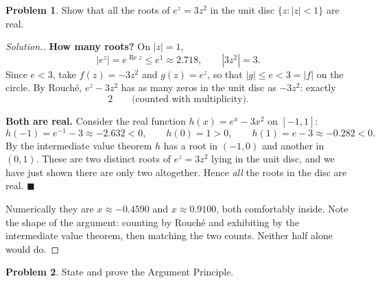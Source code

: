 \documentclass[11pt,a4paper]{article}
\theoremstyle{definition}
\newtheorem{problemx}{Problem}[section]
\newenvironment{problem}{\begin{problemx}}{\end{problemx}}
\newenvironment{solution}
  {\renewcommand{\qedsymbol}{}\begin{proof}[\textit{Solution}.]}
  {\end{proof}}
\begin{document}
\begin{problem}
Show that all the roots of $e^{z} = 3z^{2}$ in the unit disc
$\{z : \left|z\right| < 1\}$ are real.
\end{problem}

\begin{solution}
\textbf{How many roots?} On $\left|z\right| = 1$,
$$\left|e^{z}\right| = e^{\operatorname{Re}z} \leq e^{1} \approx 2.718,
\qquad \left|3z^{2}\right| = 3 .$$
Since $e < 3$, take $f(z) = -3z^{2}$ and $g(z) = e^{z}$, so that
$\left|g\right| \leq e < 3 = \left|f\right|$ on the circle. By Rouch\'e,
$e^{z}-3z^{2}$ has as many zeros in the unit disc as $-3z^{2}$: exactly
$$2 \qquad\text{(counted with multiplicity).}$$

\textbf{Both are real.} Consider the real function $h(x) = e^{x} - 3x^{2}$ on
$[-1,1]$:
$$h(-1) = e^{-1} - 3 \approx -2.632 < 0,\qquad
h(0) = 1 > 0,\qquad
h(1) = e - 3 \approx -0.282 < 0 .$$
By the intermediate value theorem $h$ has a root in $(-1,0)$ and another in
$(0,1)$. These are two distinct roots of $e^{z}=3z^{2}$ lying in the unit disc,
and we have just shown there are only two altogether. Hence \emph{all} the roots
in the disc are real. $\blacksquare$

Numerically they are $x \approx -0.4590$ and $x \approx 0.9100$, both comfortably
inside. Note the shape of the argument: counting by Rouch\'e and exhibiting by the
intermediate value theorem, then matching the two counts. Neither half alone
would do.
\end{solution}


\begin{problem}
State and prove the Argument Principle.
\end{problem}
\end{document}

